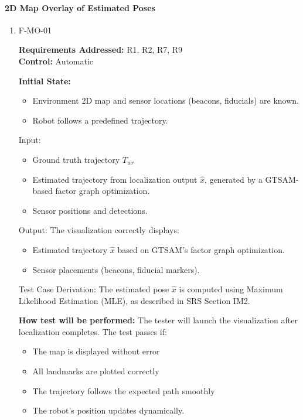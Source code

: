 \documentclass[12pt, titlepage]{article}
\begin{document}
\paragraph{2D Map Overlay of Estimated Poses}
\begin{enumerate}					
\item{F-MO-01}

\textbf{Requirements Addressed:} R1, R2, R7, R9\\
\textbf{Control:} Automatic
					
\textbf{Initial State: }
\begin{itemize}
  \item Environment 2D map and sensor locations (beacons, fiducials) are known.
  \item Robot follows a predefined trajectory.
\end{itemize}
					
Input: \begin{itemize}
  \item Ground truth trajectory $T_{wr}$
  \item Estimated trajectory from localization output $\hat{x}$, generated by a GTSAM-based factor graph optimization.
  \item Sensor positions and detections.
\end{itemize}

Output: The visualization correctly displays:
\begin{itemize}
    \item Estimated trajectory $\hat{x}$ based on GTSAM’s factor graph optimization.
    \item Sensor placements (beacons, fiducial markers).
\end{itemize}

Test Case Derivation: The estimated pose $\hat{x}$ is computed using Maximum Likelihood Estimation (MLE), as described in SRS Section IM2.

\textbf{How test will be performed:} The tester will launch the visualization after localization completes. The test passes if:
\begin{itemize}
  \item The map is displayed without error
  \item All landmarks are plotted correctly
  \item The trajectory follows the expected path smoothly
  \item The robot's position updates dynamically.
\end{itemize}

\end{enumerate}
\end{document}
